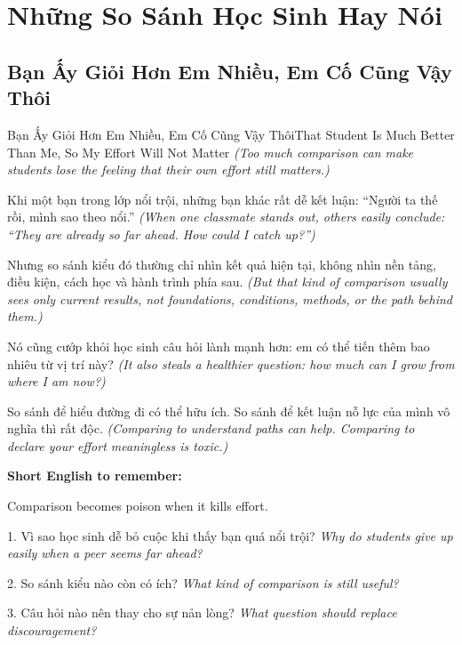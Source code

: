 \chapter{Những So Sánh Học Sinh Hay Nói}

\section{Bạn Ấy Giỏi Hơn Em Nhiều, Em Cố Cũng Vậy Thôi}
\begin{truyen}{Bạn Ấy Giỏi Hơn Em Nhiều, Em Cố Cũng Vậy Thôi}{That Student Is Much Better Than Me, So My Effort Will Not Matter}
\textit{(Too much comparison can make students lose the feeling that their own effort still matters.)}

Khi một bạn trong lớp nổi trội, những bạn khác rất dễ kết luận: “Người ta thế rồi, mình sao theo nổi.”
\textit{(When one classmate stands out, others easily conclude: “They are already so far ahead. How could I catch up?”)}

Nhưng so sánh kiểu đó thường chỉ nhìn kết quả hiện tại, không nhìn nền tảng, điều kiện, cách học và hành trình phía sau.
\textit{(But that kind of comparison usually sees only current results, not foundations, conditions, methods, or the path behind them.)}

Nó cũng cướp khỏi học sinh câu hỏi lành mạnh hơn: em có thể tiến thêm bao nhiêu từ vị trí này?
\textit{(It also steals a healthier question: how much can I grow from where I am now?)}
\end{truyen}

\begin{baihoc}
So sánh để hiểu đường đi có thể hữu ích. So sánh để kết luận nỗ lực của mình vô nghĩa thì rất độc.
\textit{(Comparing to understand paths can help. Comparing to declare your effort meaningless is toxic.)}
\end{baihoc}

\begin{ghinhoanh}
\textbf{Short English to remember:}

Comparison becomes poison when it kills effort.

\end{ghinhoanh}

\begin{tuhocnhanh}
1. Vì sao học sinh dễ bỏ cuộc khi thấy bạn quá nổi trội? \textit{Why do students give up easily when a peer seems far ahead?}

2. So sánh kiểu nào còn có ích? \textit{What kind of comparison is still useful?}

3. Câu hỏi nào nên thay cho sự nản lòng? \textit{What question should replace discouragement?}
\end{tuhocnhanh}
\ngancach

